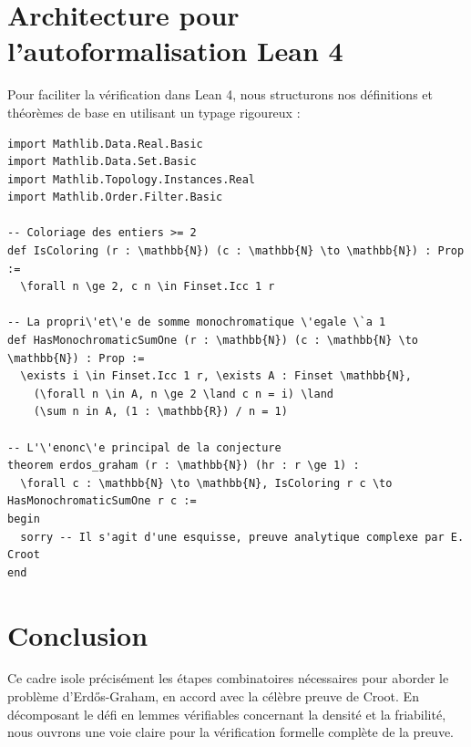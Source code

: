 \documentclass[12pt,a4paper]{article}
\begin{document}
\section{Architecture pour l'autoformalisation Lean 4}
Pour faciliter la v\'erification dans Lean 4, nous structurons nos d\'efinitions et th\'eor\`emes de base en utilisant un typage rigoureux :

\begin{verbatim}
import Mathlib.Data.Real.Basic
import Mathlib.Data.Set.Basic
import Mathlib.Topology.Instances.Real
import Mathlib.Order.Filter.Basic

-- Coloriage des entiers >= 2
def IsColoring (r : \mathbb{N}) (c : \mathbb{N} \to \mathbb{N}) : Prop :=
  \forall n \ge 2, c n \in Finset.Icc 1 r

-- La propri\'et\'e de somme monochromatique \'egale \`a 1
def HasMonochromaticSumOne (r : \mathbb{N}) (c : \mathbb{N} \to \mathbb{N}) : Prop :=
  \exists i \in Finset.Icc 1 r, \exists A : Finset \mathbb{N},
    (\forall n \in A, n \ge 2 \land c n = i) \land
    (\sum n in A, (1 : \mathbb{R}) / n = 1)

-- L'\'enonc\'e principal de la conjecture
theorem erdos_graham (r : \mathbb{N}) (hr : r \ge 1) :
  \forall c : \mathbb{N} \to \mathbb{N}, IsColoring r c \to HasMonochromaticSumOne r c :=
begin
  sorry -- Il s'agit d'une esquisse, preuve analytique complexe par E. Croot
end
\end{verbatim}

\section{Conclusion}
Ce cadre isole pr\'ecis\'ement les \'etapes combinatoires n\'ecessaires pour aborder le probl\`eme d'Erd\H{o}s-Graham, en accord avec la c\'el\`ebre preuve de Croot. En d\'ecomposant le d\'efi en lemmes v\'erifiables concernant la densit\'e et la friabilit\'e, nous ouvrons une voie claire pour la v\'erification formelle compl\`ete de la preuve.
\end{document}
